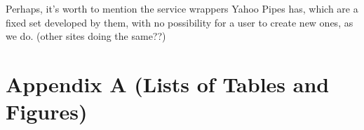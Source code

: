 \documentclass{fast_latex}
\begin{document}
Perhaps, it's worth to mention the service wrappers Yahoo Pipes has, which are a fixed set developed by them, with no possibility for a user to create new ones, as we do. (other sites doing the same??)


\clearpage



\clearpage
\doublespacing
\section*{Appendix A (Lists of Tables and Figures)}

\listoftables

\listoffigures
\end{document}

